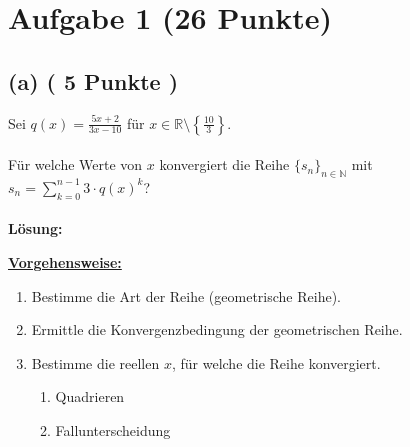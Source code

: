 \vspace{1cm}
\renewcommand{\labelenumi}{\theenumi.}
\section*{Aufgabe 1 (26 Punkte)}
\vspace{0.4cm}
\subsection*{(a) ( 5 Punkte )}
Sei $q(x) = \frac{5x+2}{3x-10}$ für $x \in \mathbb{R} \setminus \left\lbrace \frac{10}{3} \right\rbrace$.
\\
\\
Für welche Werte von $x$ konvergiert die Reihe $\lbrace s_n \rbrace_{n \in \mathbb{N}}$
mit $s_n = \sum_{k=0}^{n-1} 3 \cdot q(x)^k$?
\\
\\
\textbf{Lösung:}
\begin{mdframed}
\underline{\textbf{Vorgehensweise:}}
\begin{enumerate}
\item Bestimme die Art der Reihe (geometrische Reihe).
\item Ermittle die Konvergenzbedingung der geometrischen Reihe.
\item Bestimme die reellen $x$, für welche die Reihe konvergiert.
\begin{enumerate}
\item Quadrieren
\item Fallunterscheidung
\end{enumerate} 
\end{enumerate}
\end{mdframed}


